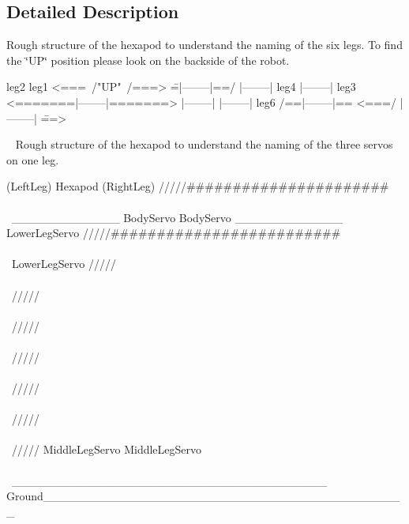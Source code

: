 \subsection{Detailed Description}
Rough structure of the hexapod to understand the naming of the six legs. To find the \char`\"{}\+U\+P\char`\"{} position please look on the backside of the robot. 
\begin{DoxyPre}
\begin{DoxyVerb}leg2                  leg1
<===\     /"UP"\     /===>
     \==|--------|==/
        |--------|
leg4    |--------|  leg3
<=======|--------|=======>
        |--------|
        |--------|
leg6 /==|--------|==
<===/   |--------|   \===>
\end{DoxyVerb}

\end{DoxyPre}
 ~\newline
Rough structure of the hexapod to understand the naming of the three servos on one leg. \begin{DoxyVerb}         (LeftLeg)                      Hexapod                          (RightLeg) 
                            /////######################\\\\\        
       _____________     BodyServo                   BodyServo          _____________
       LowerLegServo      /////#########################\\\\\           LowerLegServo
     /////      \\\\\    /////                           \\\\\        /////      \\\\\
    /////        \\\\\  /////                             \\\\\      /////        \\\\\
   /////        MiddleLegServo                             MiddleLegServo          \\\\\
____\/__________________________________ Ground______________________________________\/______                                                            
\end{DoxyVerb}
 

